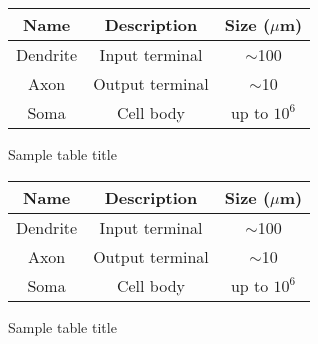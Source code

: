 \documentclass[11pt]{article}
\begin{document}
\begin{minipage}{\textwidth}

\begin{minipage}[t]{0.48\textwidth}
\makeatletter{}
\begin{tabular}{ccc}
    \toprule
    Name     & Description     & Size ($\mu$m) \\
    \midrule
    Dendrite & Input terminal  & $\sim$100     \\
    Axon     & Output terminal & $\sim$10      \\
    Soma     & Cell body       & up to $10^6$  \\
    \bottomrule
\end{tabular}
\caption{Sample table title}
\label{sample-table}
\end{minipage}
\qquad

\begin{minipage}[t]{0.48\textwidth}
\makeatletter{}
\begin{tabular}{ccc}
    \toprule
    Name     & Description     & Size ($\mu$m) \\
    \midrule
    Dendrite & Input terminal  & $\sim$100     \\
    Axon     & Output terminal & $\sim$10      \\
    Soma     & Cell body       & up to $10^6$  \\
    \bottomrule
\end{tabular}
\caption{Sample table title}
\label{sample-table1}
\end{minipage}
\end{minipage}

\begin{table}
\caption{Caption for total table}
\centering
{}
\qquad
{}
\end{table}
\end{document}
